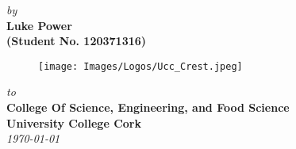 \begin{titlepage}
\begin{center}
                      \vspace{10mm}
                   {\em  by} \\ \vspace{3mm}
             {\large \bf Luke Power} \\
{\large \bf (Student No. 120371316)}\\[.3in]

\vfill

\begin{figure}[h]
  \begin{center}
  \texttt{[image: Images/Logos/Ucc\_Crest.jpeg]}
  \end{center}
\end{figure}
\vspace*{0.2cm}

{\em\large to }\\%
{\bf\large College Of Science, Engineering, and Food Science} \\%
{\bf \large University College Cork}\\%

{\it\large \today}

\end{center}

\end{titlepage}

\clearpage

